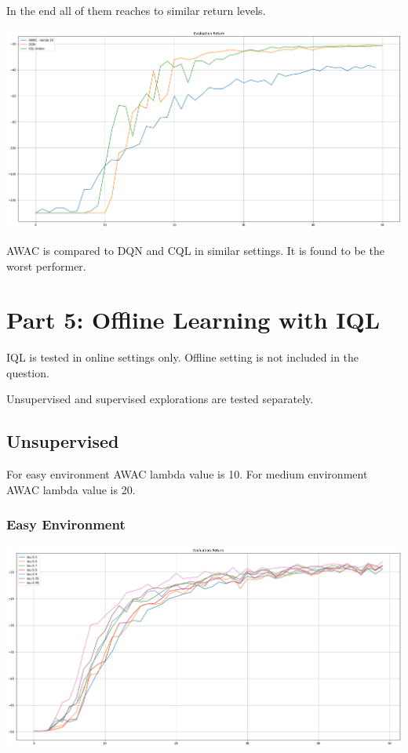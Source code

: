 \documentclass[11pt]{article}
\begin{document}
    In the end all of them reaches to similar return levels.

    \hspace*{-0.3in}
    \includegraphics[scale=0.30]{q4/eval-medium-supervised-compared}

    AWAC is compared to DQN and CQL in similar settings.
    It is found to be the worst performer.



    \section{Part 5: Offline Learning with IQL}

    IQL is tested in online settings only.
    Offline setting is not included in the question.

    Unsupervised and supervised explorations are tested separately.

    \subsection{Unsupervised}

    For easy environment AWAC lambda value is 10.
    For medium environment AWAC lambda value is 20.

    \subsubsection{Easy Environment}

    \hspace*{-0.3in}
    \includegraphics[scale=0.30]{q5/eval-easy-unsupervised}
\end{document}
